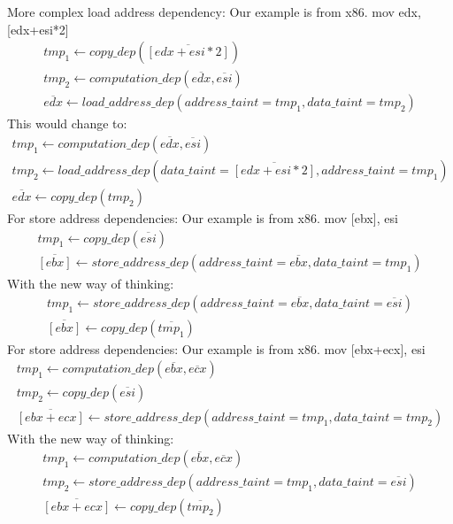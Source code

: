 \documentclass{article}
\begin{document}
More complex load address dependency:
Our example is from x86. mov edx, [edx+esi*2]
\begin{align*}
        tmp_1 \leftarrow copy\_dep(\overline{[edx+esi*2]})\\
tmp_2 \leftarrow computation\_dep(\overline{edx},\overline{esi}) \\
        \overline{edx} \leftarrow load\_address\_dep(address\_taint=tmp_1,data\_taint=tmp_2)
\end{align*}
This would change to:
\begin{align*}
tmp_1 \leftarrow computation\_dep(\overline{edx},\overline{esi}) \\
        tmp_2 \leftarrow load\_address\_dep(data\_taint=\overline{[edx+esi*2]},address\_taint=tmp_1)\\
        \overline{edx} \leftarrow copy\_dep(tmp_2)
\end{align*}
For store address dependencies:
Our example is from x86. mov [ebx], esi
\begin{align*}
        tmp_1 \leftarrow copy\_dep(\overline{esi})\\
        \overline{[ebx]} \leftarrow store\_address\_dep(address\_taint=\overline{ebx},data\_taint=tmp_1)
\end{align*}
With the new way of thinking:
\begin{align*}
        tmp_1 \leftarrow store\_address\_dep(address\_taint=\overline{ebx},data\_taint=\overline{esi})\\
        \overline{[ebx]} \leftarrow copy\_dep(\overline{tmp_1})
\end{align*}
For store address dependencies:
Our example is from x86. mov [ebx+ecx], esi
\begin{align*}
        tmp_1 \leftarrow computation\_dep(\overline{ebx},\overline{ecx})\\
        tmp_2 \leftarrow copy\_dep(\overline{esi})\\
        \overline{[ebx+ecx]} \leftarrow store\_address\_dep(address\_taint=tmp_1,data\_taint=tmp_2)
\end{align*}
With the new way of thinking:
\begin{align*}
        tmp_1 \leftarrow computation\_dep(\overline{ebx},\overline{ecx})\\
        tmp_2 \leftarrow store\_address\_dep(address\_taint=tmp_1,data\_taint=\overline{esi})\\
        \overline{[ebx+ecx]} \leftarrow copy\_dep(\overline{tmp_2})
\end{align*}
\end{document}
